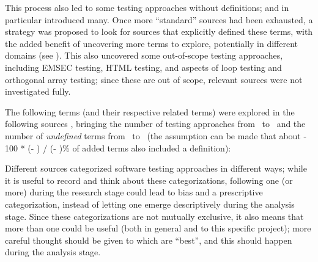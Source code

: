 This process also led to some testing approaches without definitions;
\citep{IEEE2022} and \citep{Firesmith2015} in particular introduced many.
Once more ``standard'' sources had been exhausted, a strategy was proposed to
look for sources that explicitly defined these terms, with the added benefit of
uncovering more terms to explore, potentially in different domains (see
). This also uncovered some out-of-scope testing approaches,
including EMSEC testing, HTML testing, and aspects of loop testing and
orthogonal array testing; since these
are out of scope, relevant sources were not investigated fully.

The following terms (and their respective related terms)
were explored%
\ifnotpaper
      { in the following sources}%
\fi, bringing the number of testing
approaches from \the\TotalBefore~to \the\TotalAfter~and the number of
\emph{undefined} terms from \the\UndefBefore~to \the\UndefAfter~(the assumption
can be made that about \the{} - 100 * (\UndefAfter - \UndefBefore) /
(\TotalAfter - \TotalBefore)\relax\% of added terms also included a definition):



Different sources categorized software testing approaches in different ways;
while it is useful to record and think about these
categorizations, following one (or more)
during the research
stage could lead to bias and a prescriptive categorization, instead of letting
one emerge descriptively during the analysis stage. Since these categorizations
are not mutually exclusive, it also means that more than one could be useful
(both in general and to this specific project); more careful thought should be
given to which are ``best'', and this should happen during the analysis stage.
